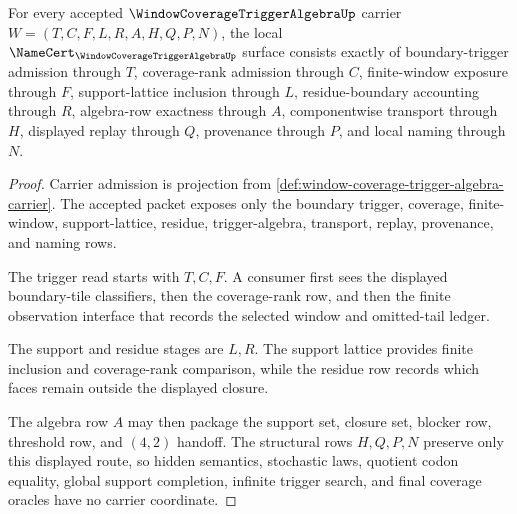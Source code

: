 \begin{theorem}
\label{thm:window-coverage-trigger-algebra-namecert-obligations}
For every accepted $\WindowCoverageTriggerAlgebraUp$ carrier $W=(T,C,F,L,R,A,H,Q,P,N)$, the local $\NameCert_{\WindowCoverageTriggerAlgebraUp}$ surface consists exactly of boundary-trigger admission through $T$, coverage-rank admission through $C$, finite-window exposure through $F$, support-lattice inclusion through $L$, residue-boundary accounting through $R$, algebra-row exactness through $A$, componentwise transport through $H$, displayed replay through $Q$, provenance through $P$, and local naming through $N$.
\end{theorem}
\begin{proof}
Carrier admission is projection from \autoref{def:window-coverage-trigger-algebra-carrier}. The accepted packet exposes only the boundary trigger, coverage, finite-window, support-lattice, residue, trigger-algebra, transport, replay, provenance, and naming rows.

The trigger read starts with $T,C,F$. A consumer first sees the displayed boundary-tile classifiers, then the coverage-rank row, and then the finite observation interface that records the selected window and omitted-tail ledger.

The support and residue stages are $L,R$. The support lattice provides finite inclusion and coverage-rank comparison, while the residue row records which faces remain outside the displayed closure.

The algebra row $A$ may then package the support set, closure set, blocker row, threshold row, and $(4,2)$ handoff. The structural rows $H,Q,P,N$ preserve only this displayed route, so hidden semantics, stochastic laws, quotient codon equality, global support completion, infinite trigger search, and final coverage oracles have no carrier coordinate.
\end{proof}

